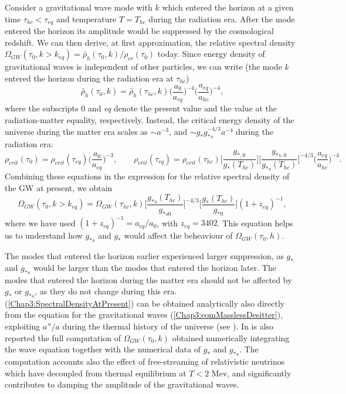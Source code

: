 \documentclass[11pt,a4paper,twoside]{book}
\begin{document}
Consider  a gravitational wave mode with $ k $ which entered the horizon at a given time $ \tau_{hc} < \tau_{eq} $ and temperature $ T=T_{hc} $ during the radiation era. After the mode entered the horizon its amplitude would be suppressed by the cosmological redshift. We can then derive, at first approximation, the relative spectral density $\Omega_{GW}(\tau_{0},k > k_{eq}) = \tilde{\rho_{h}}(\tau_{0},k)/\rho_{cr}(\tau_{0})$ today. Since energy density of gravitational waves is independent of other particles, we can write (the mode $ k $ entered the horizon during the radiation era at $ \tau_{hc} $)
\begin{equation}
 \tilde{\rho_{h}}(\tau_{0},k) =  \tilde{\rho_{h}}(\tau_{hc},k)\Big (\frac{a_{0}}{a_{eq}}\Big)^{-4}\Big (\frac{a_{eq}}{a_{hc}}\Big)^{-4},
\end{equation}
where the subscripts 0 and \textit{eq} denote the present value and the value at the radiation-matter equality, respectively.
Instead, the critical energy density of the universe during the matter era scales as $\sim a^{-3}$, and $ \sim g_{*}g_{*s}^{-4/3}a^{-4} $ during  the radiation era:
\begin{equation}
	\label{Chap3:CriticalDensityEvolution1}
	\rho_{crit}(\tau_{0})=\rho_{crit}(\tau_{eq})\Big(\frac{a_{0}}{a_{eq}}\Big)^{-3},
	\qquad
	\rho_{crit}(\tau_{eq})= \rho_{crit}(\tau_{hc})\Big[\frac{g_{*,0}}{g_{*}(T_{hc})}\Big]\Big [\frac{g_{*s,0}}{g_{*s}(T_{hc})}\Big]^{-4/3}\Big(\frac{a_{eq}}{a_{hc}}\Big)^{-4}.
\end{equation}  
Combining these equations in the expression for the relative spectral density of the GW at present, we obtain
\begin{equation}
	\label{Chap3:SpectralDensityAtPresent}
	\Omega_{GW}(\tau_{0}, k>k_{eq}) = \Omega_{GW}(\tau_{hc},k)\Big[\frac{g_{*s}(T_{hc})}{g_{*s0}}\Big]^{-4/3}\Big [\frac{g_{*}(T_{hc})}{g_{*0}}\Big] (1+z_{eq})^{-1},
\end{equation}
where we have used $ (1+z_{eq})^{-1} = a_{eq}/a_{0} $, with $ z_{eq}=3402 $. This equation helps us to understand how $ g_{*s} $ and $g_{*}$ would affect the beheaviour of $ \Omega_{GW}(\tau_{0},h) $.

The modes that entered the horizon earlier experienced larger suppression, as $ g_{*} $ and $ g_{*s} $ would be larger than the modes that entered the horizon later. The modes that entered the horizon during the matter era should not be affected by $ g_{*} $ or $ g_{*s} $, as they do not change during this era. (\ref{Chap3:SpectralDensityAtPresent}) can be obtained analytically also  directly from  the equation for the gravitational waves (\ref{Chap3:eomMasslessDesitter}), exploiting $ a''/a $ during the thermal history of the universe (see \cite{Chap3:GW_Watanabe_Komatsu}). 
In \cite{Chap3:GW_Watanabe_Komatsu} is also reported the full  computation of $ \Omega_{GW}(\tau_{0},k) $ obtained numerically integrating the wave equation together with the numerical data of $ g_{*} $ and $ g_{*s} $. The computation accounts also the effect of free-streaming of relativistic neutrinos which have decoupled from thermal equilibrium at $T < 2 $ Mev, and significantly contributes to damping the amplitude of the gravitational waves.
\end{document}
